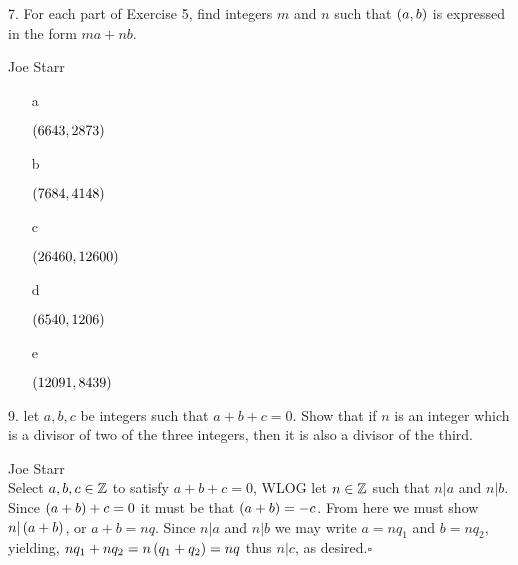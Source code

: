 \newpage
\begin{mdframed}[style=darkQuesion]
    7.    For each part of Exercise 5, find integers $m$ and $n$ such that 
$\left(a,b\right)$ is expressed in the form $ma+nb$. 

\end{mdframed}

\begin{mdframed}[style=darkAnswer]
    Joe Starr\\
\begin{itemize}
    \item [a] {$\left(6643,2873\right)$
    
    }
    \item [b] {$\left(7684,4148\right)$
    
    }
    \item [c] {$\left(26460,12600\right)$
    
    }
    \item [d] {$\left(6540,1206\right)$
   
    }
    \item [e] {$\left(12091,8439\right)$
    
    }
\end{itemize}
\end{mdframed}
\newpage
\begin{mdframed}[style=darkQuesion]
9.  let $a,b,c$ be integers such that $a+b+c=0$. Show that if $n$ is an integer
which is a divisor of two of the three integers, then it is also a divisor of 
the third. 

\end{mdframed}

\begin{mdframed}[style=darkAnswer]
Joe Starr\\
Select $a,b,c\in \mathbb{Z}$ to satisfy $a+b+c=0$, WLOG let $n\in \mathbb{Z}$ such that 
$n\vert a$ and $n\vert b$. Since $\left(a+b\right)+c=0$ it must be that $\left(a+b\right)=-c$.
From here we must show $n\vert\left(a+b\right)$, or $a+b=nq$. Since $n\vert a$ and 
$n\vert b$ we may write $a=nq_1$ and $b=nq_2$, yielding, 
$nq_1+nq_2=n\left(q_1+q_2\right)=nq$ thus $n\vert c$, as desired.$\square$ 
\end{mdframed}